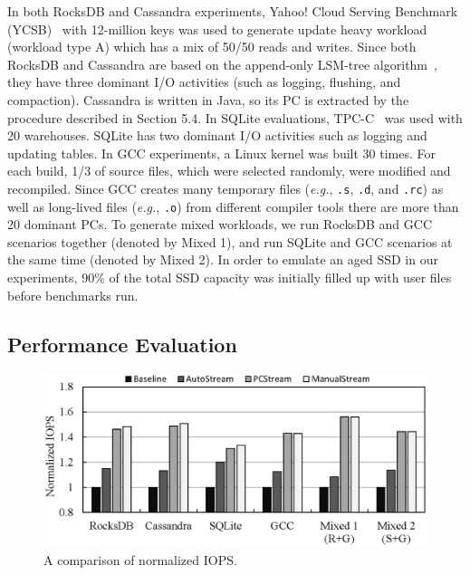 In both RocksDB and Cassandra experiments, Yahoo! Cloud Serving Benchmark
(YCSB)~\cite{YCSB} with 12-million keys was used to generate update heavy
workload (workload type A) which has a mix of 50/50 reads and writes.  Since
both RocksDB and Cassandra are based on the append-only LSM-tree
algorithm~\cite{LSM}, they have three dominant I/O activities (such as logging,
flushing, and compaction).  Cassandra is written in Java, so its PC is
extracted by the procedure described in Section 5.4.  In SQLite evaluations,
TPC-C~\cite{TPCC} was used with 20 warehouses.  SQLite has two dominant I/O
activities such as logging and updating tables.  In GCC experiments, a Linux
kernel was built 30 times.  For each build, 1/3 of source files, which were
selected randomly, were modified and recompiled.  Since GCC creates many
temporary files ({\it e.g.}, \texttt{.s}, \texttt{.d}, and \texttt{.rc}) as
well as long-lived files ({\it e.g.}, \texttt{.o}) from different compiler
tools there are more than 20 dominant PCs.  To generate mixed workloads, we run
RocksDB and GCC scenarios together (denoted by Mixed 1), and run SQLite and GCC
scenarios at the same time (denoted by Mixed 2).  In order to emulate an aged
SSD in our experiments, 90\% of the total SSD capacity was initially filled up
with user files before benchmarks run.

\vspace{-10pt}
\subsection{Performance Evaluation}
\vspace{-5pt}

\begin{figure}[t]
	\centering
	\includegraphics[width=0.95\linewidth]{figure/iops}
	\caption{A comparison of normalized IOPS.}
	\vspace{-5pt}
	\label{fig:iops}
	\vspace{-10pt}
\end{figure}


